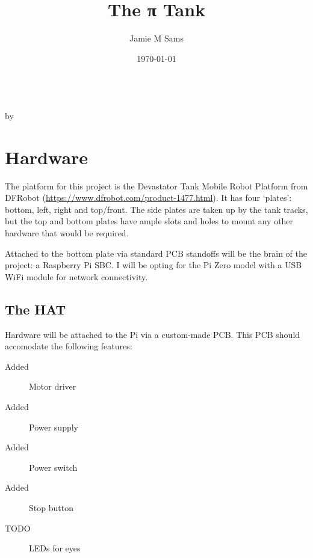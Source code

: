 \documentclass[a4paper,openany,nomultitoc]{dndbook}
\title{The π Tank}
\author{Jamie M Sams}
\date{\today}
\begin{document}
\DndSetThemeColor[DmgLavender]

\frontmatter

\begin{titlepage}
	\vspace*{\fill}
	\centering
	{\Huge \thetitle}\\
	\vspace*{\fill}
	{\large by \theauthor}
\end{titlepage}


\mainmatter%

\FloatBarrier
\chapter{Hardware}
\FloatBarrier
\begin{multicols}{2}

The platform for this project is the Devastator Tank Mobile Robot Platform from DFRobot (\url{https://www.dfrobot.com/product-1477.html}).  It has four `plates': bottom, left, right and top/front.  The side plates are taken up by the tank tracks, but the top and bottom plates have ample slots and holes to mount any other hardware that would be required.

Attached to the bottom plate via standard PCB standoffs will be the brain of the project: a Raspberry Pi SBC.  I will be opting for the Pi Zero model with a USB WiFi module for network connectivity.

\section{The HAT}

Hardware will be attached to the Pi via a custom-made PCB.  This PCB should accomodate the following features:
\begin{description}
\item[Added]Motor driver
\item[Added]Power supply
\item[Added]Power switch
\item[Added]Stop button
\item[TODO]LEDs for eyes
\end{description}

\end{multicols}
\end{document}
